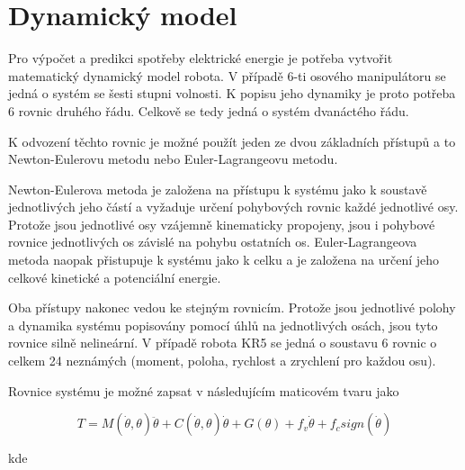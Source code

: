 

\chapter{Dynamický model}

Pro výpočet a predikci spotřeby elektrické energie je potřeba vytvořit matematický dynamický model robota. 
V případě 6-ti osového manipulátoru se jedná o systém se šesti stupni volnosti. K popisu jeho dynamiky je proto potřeba 6 rovnic druhého řádu. Celkově se tedy jedná o systém dvanáctého řádu. 

K odvození těchto rovnic je možné použít jeden ze dvou základních přístupů a to Newton-Eulerovu metodu nebo Euler-Lagrangeovu metodu. 

Newton-Eulerova metoda je založena na přístupu k systému jako k soustavě jednotlivých jeho částí a vyžaduje určení pohybových rovnic každé jednotlivé osy. Protože jsou jednotlivé osy vzájemně kinematicky propojeny, jsou i pohybové rovnice jednotlivých os závislé na pohybu ostatních os. Euler-Lagrangeova metoda naopak přistupuje k systému jako k celku a je založena na určení jeho celkové kinetické a potenciální energie. 

Oba přístupy nakonec vedou ke stejným rovnicím. Protože jsou jednotlivé polohy a dynamika systému popisovány pomocí úhlů na jednotlivých osách, jsou tyto rovnice silně nelineární. V případě robota KR5 se jedná o soustavu 6 rovnic o celkem 24 neznámých (moment, poloha, rychlost a zrychlení pro každou osu). 

Rovnice systému je možné zapsat v následujícím maticovém tvaru jako 

\begin{equation}
T = M(\dot{\theta},\theta)\ddot{\theta} + C(\dot{\theta},\theta)\dot{\theta} + G(\theta) + f_v\dot{\theta} + f_csign(\dot{\theta})
\label{dyn_rovnice_eq}
\end{equation}

kde

